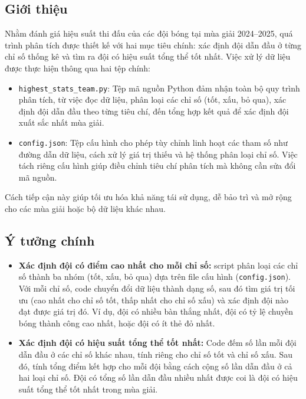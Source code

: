 \documentclass[12pt, a4paper]{report}
\begin{document}
\subsection{Giới thiệu}
Nhằm đánh giá hiệu suất thi đấu của các đội bóng tại mùa giải 2024–2025, quá trình phân tích được thiết kế với hai mục tiêu chính: xác định đội dẫn đầu ở từng chỉ số thống kê và tìm ra đội có hiệu suất tổng thể tốt nhất.
Việc xử lý dữ liệu được thực hiện thông qua hai tệp chính:
\begin{itemize}
    \item \texttt{highest\_stats\_team.py}: Tệp mã nguồn Python đảm nhận toàn bộ quy trình phân tích, từ việc đọc dữ liệu, phân loại các chỉ số (tốt, xấu, bỏ qua), xác định đội dẫn đầu theo từng tiêu chí, đến tổng hợp kết quả để xác định đội xuất sắc nhất mùa giải.
    \item \texttt{config.json}: Tệp cấu hình cho phép tùy chỉnh linh hoạt các tham số như đường dẫn dữ liệu, cách xử lý giá trị thiếu và hệ thống phân loại chỉ số. Việc tách riêng cấu hình giúp điều chỉnh tiêu chí phân tích mà không cần sửa đổi mã nguồn.
\end{itemize}
Cách tiếp cận này giúp tối ưu hóa khả năng tái sử dụng, dễ bảo trì và mở rộng cho các mùa giải hoặc bộ dữ liệu khác nhau.

\subsection{Ý tưởng chính}
\begin{itemize}[leftmargin=0em]
\renewcommand{\labelitemi}{}
    \item \textbf{Xác định đội có điểm cao nhất cho mỗi chỉ số:} script phân loại các chỉ số thành ba nhóm (tốt, xấu, bỏ qua) dựa trên file cấu hình (\texttt{config.json}). Với mỗi chỉ số, code chuyển đổi dữ liệu thành dạng số, sau đó tìm giá trị tối ưu (cao nhất cho chỉ số tốt, thấp nhất cho chỉ số xấu) và xác định đội nào đạt được giá trị đó. Ví dụ, đội có nhiều bàn thắng nhất, đội có tỷ lệ chuyền bóng thành công cao nhất, hoặc đội có ít thẻ đỏ nhất.
    \item \textbf{Xác định đội có hiệu suất tổng thể tốt nhất:} Code đếm số lần mỗi đội dẫn đầu ở các chỉ số khác nhau, tính riêng cho chỉ số tốt và chỉ số xấu. Sau đó, tính tổng điểm kết hợp cho mỗi đội bằng cách cộng số lần dẫn đầu ở cả hai loại chỉ số. Đội có tổng số lần dẫn đầu nhiều nhất được coi là đội có hiệu suất tổng thể tốt nhất trong mùa giải.
\end{itemize}
\end{document}
